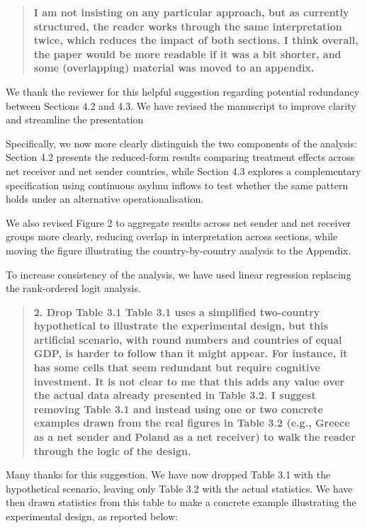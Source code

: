 \documentclass[
  11pt,
]{article}
\begin{document}
\begin{quote}
\textbf{I am not insisting on any particular approach, but as currently structured, the reader works through the same interpretation twice, which reduces the impact of both sections. I think overall, the paper would be more readable if it was a bit shorter, and some (overlapping) material was moved to an appendix.}
\end{quote}

We thank the reviewer for this helpful suggestion regarding potential redundancy between Sections 4.2 and 4.3. We have revised the manuscript to improve clarity and streamline the presentation

Specifically, we now more clearly distinguish the two components of the analysis: Section 4.2 presents the reduced-form results comparing treatment effects across net receiver and net sender countries, while Section 4.3 explores a complementary specification using continuous asylum inflows to test whether the same pattern holds under an alternative operationalisation.

We also revised Figure 2 to aggregate results across net sender and net receiver groups more clearly, reducing overlap in interpretation across sections, while moving the figure illustrating the country-by-country analysis to the Appendix.

To increase consistency of the analysis, we have used linear regression replacing the rank-ordered logit analysis.

\begin{quote}
\textbf{2. Drop Table 3.1 Table 3.1 uses a simplified two-country hypothetical to illustrate the experimental design, but this artificial scenario, with round numbers and countries of equal GDP, is harder to follow than it might appear. For instance, it has some cells that seem redundant but require cognitive investment. It is not clear to me that this adds any value over the actual data already presented in Table 3.2. I suggest removing Table 3.1 and instead using one or two concrete examples drawn from the real figures in Table 3.2 (e.g., Greece as a net sender and Poland as a net receiver) to walk the reader through the logic of the design.}
\end{quote}

Many thanks for this suggestion. We have now dropped Table 3.1 with the hypothetical scenario, leaving only Table 3.2 with the actual statistics. We have then drawn statistics from this table to make a concrete example illustrating the experimental design, as reported below:
\end{document}
